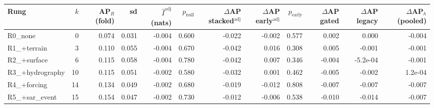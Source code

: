 \begin{tabular}{lrrrrrrrrrrr}
\toprule
Rung & $k$ & AP$_R$ (fold) & sd & $\hat I^{\mathrm{adj}}$ (nats) & $p_{\mathrm{null}}$ & $\Delta$AP stacked$^{\mathrm{adj}}$ & $\Delta$AP early$^{\mathrm{adj}}$ & $p_{\mathrm{early}}$ & $\Delta$AP gated & $\Delta$AP legacy & $\Delta$AP$_h$ (pooled) \\
\midrule
R0\_none & 0 & 0.074 & 0.031 & -0.004 & 0.600 & -0.022 & -0.002 & 0.577 & 0.002 & 0.000 & -0.004 \\
R1\_+terrain & 3 & 0.110 & 0.055 & -0.004 & 0.670 & -0.042 & 0.016 & 0.308 & 0.005 & -0.001 & -0.001 \\
R2\_+surface & 6 & 0.115 & 0.058 & -0.004 & 0.780 & -0.042 & 0.007 & 0.346 & -0.004 & -5.2e-04 & -0.001 \\
R3\_+hydrography & 10 & 0.115 & 0.051 & -0.002 & 0.580 & -0.032 & 0.001 & 0.462 & -0.005 & -0.002 & 1.2e-04 \\
R4\_+forcing & 14 & 0.134 & 0.049 & -0.002 & 0.680 & -0.019 & -0.012 & 0.808 & -0.007 & -0.007 & -0.007 \\
R5\_+sar\_event & 15 & 0.154 & 0.047 & -0.002 & 0.730 & -0.012 & -0.006 & 0.538 & -0.010 & -0.014 & -0.007 \\
\bottomrule
\end{tabular}
